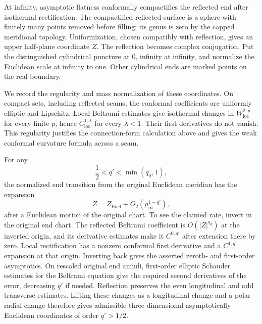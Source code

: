 At infinity, asymptotic flatness conformally compactifies the reflected
end after isothermal rectification.  The compactified reflected surface
is a sphere with finitely many points removed before filling; its genus
is zero by the capped meridional topology.  Uniformization, chosen
compatibly with reflection, gives an upper half-plane coordinate $Z$.
The reflection becomes complex conjugation.  Put the distinguished
cylindrical puncture at $0$, infinity at infinity, and normalize the
Euclidean scale at infinity to one.  Other cylindrical ends are marked
points on the real boundary.

We record the regularity and mass normalization of these coordinates.
On compact sets, including reflected seams, the conformal coefficients
are uniformly elliptic and Lipschitz.  Local Beltrami estimates give
isothermal changes in $W^{2,p}_{\mathrm{loc}}$ for every finite $p$,
hence $C^{1,\lambda}_{\mathrm{loc}}$ for every $\lambda<1$.
Their first derivatives do not vanish.  This regularity justifies the
connection-form calculation above and gives the weak conformal curvature
formula across a seam.

For any
\begin{equation}\label{r:decay-exponent}
 \frac12<q'<\min(q_d,1),
\end{equation}
the normalized end transition from the original Euclidean meridian has
the expansion
\begin{equation}\label{r:af-isothermal}
 Z=Z_{\mathrm{Eucl}}+O_2(\rho_\infty^{1-q'}),
\end{equation}
after a Euclidean motion of the original chart.
To see the claimed rate, invert in the original end chart.  The reflected
Beltrami coefficient is $O(|Z|^{q_d})$ at the inverted origin, and its
derivative estimates make it $C^{0,q'}$ after extension there by zero.
Local rectification has a nonzero conformal first derivative and a
$C^{1,q'}$ expansion at that origin.  Inverting back gives the asserted
zeroth- and first-order asymptotics.  On rescaled original end annuli,
first-order elliptic Schauder estimates for the Beltrami equation give
the required second derivatives of the error, decreasing $q'$ if needed.
Reflection preserves the even longitudinal and odd transverse estimates.
Lifting these changes as a longitudinal change and a polar radial change
therefore gives admissible three-dimensional asymptotically Euclidean
coordinates of order $q'>1/2$.

